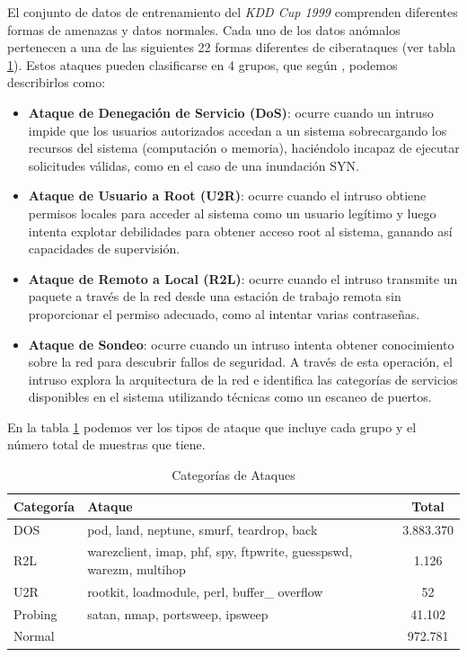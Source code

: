 El conjunto de datos de entrenamiento del \textit{KDD Cup 1999} comprenden diferentes formas de amenazas y datos normales. Cada uno de los datos anómalos pertenecen a una de las siguientes 22 formas diferentes de ciberataques (ver tabla \ref{tab: catKDD}). Estos ataques pueden clasificarse en 4 grupos, que según \citep{arief2022comparison}, podemos describirlos como:
\begin{itemize}
    \item \textbf{Ataque de Denegación de Servicio (DoS)}: ocurre cuando un intruso impide que los usuarios autorizados accedan a un sistema sobrecargando los recursos del sistema (computación o memoria), haciéndolo incapaz de ejecutar solicitudes válidas, como en el caso de una inundación SYN.
    \item \textbf{Ataque de Usuario a Root (U2R)}: ocurre cuando el intruso obtiene permisos locales para acceder al sistema como un usuario legítimo y luego intenta explotar debilidades para obtener acceso root al sistema, ganando así capacidades de supervisión.
    \item \textbf{Ataque de Remoto a Local (R2L)}: ocurre cuando el intruso transmite un paquete a través de la red desde una estación de trabajo remota sin proporcionar el permiso adecuado, como al intentar varias contraseñas.
    \item \textbf{Ataque de Sondeo}: ocurre cuando un intruso intenta obtener conocimiento sobre la red para descubrir fallos de seguridad. A través de esta operación, el intruso explora la arquitectura de la red e identifica las categorías de servicios disponibles en el sistema utilizando técnicas como un escaneo de puertos.
\end{itemize}

En la tabla \ref{tab: catKDD} podemos ver los tipos de ataque que incluye cada grupo y el número total de muestras que tiene.

\begin{table}[h!]
    \centering
    \begin{tabular}{|l|l|c|}
        \hline
        \textbf{Categoría} & \textbf{Ataque} & \textbf{Total}\\
        \hline
        DOS & pod, land, neptune, smurf, teardrop, back & 3.883.370\\
        R2L & warezclient, imap, phf, spy, ftpwrite, guesspswd, warezm, multihop & 1.126\\
        U2R & rootkit, loadmodule, perl, buffer\_ overflow & 52\\
        Probing & satan, nmap, portsweep, ipsweep & 41.102\\
        Normal & & 972.781 \\
        \hline
    \end{tabular}
    \caption{Categorías de Ataques}
    \label{tab: catKDD}
\end{table}


